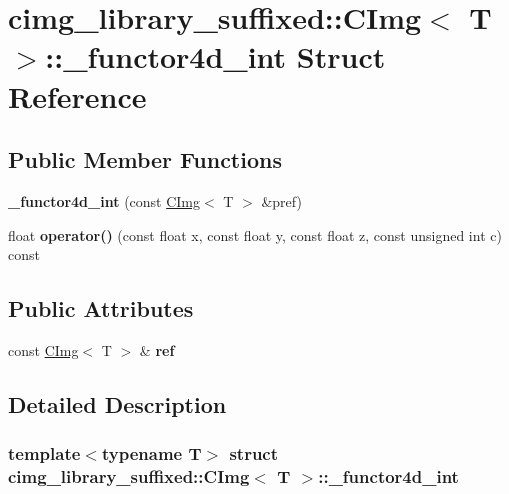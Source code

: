 \hypertarget{structcimg__library__suffixed_1_1CImg_1_1__functor4d__int}{}\section{cimg\+\_\+library\+\_\+suffixed\+:\+:C\+Img$<$ T $>$\+:\+:\+\_\+functor4d\+\_\+int Struct Reference}
\label{structcimg__library__suffixed_1_1CImg_1_1__functor4d__int}
\subsection*{Public Member Functions}
\begin{DoxyCompactItemize}
\item 
\mbox{\label{structcimg__library__suffixed_1_1CImg_1_1__functor4d__int_a497876b7332984108b6ae60b9bd3a1ce}} 
{\bfseries \+\_\+functor4d\+\_\+int} (const \hyperlink{structcimg__library__suffixed_1_1CImg}{C\+Img}$<$ T $>$ \&pref)
\item 
\mbox{\label{structcimg__library__suffixed_1_1CImg_1_1__functor4d__int_a948af15f62a8c8270cfcd5c5eee59ad6}} 
float {\bfseries operator()} (const float x, const float y, const float z, const unsigned int c) const
\end{DoxyCompactItemize}
\subsection*{Public Attributes}
\begin{DoxyCompactItemize}
\item 
\mbox{\label{structcimg__library__suffixed_1_1CImg_1_1__functor4d__int_a6c9cfad39fcfbb4617efdd5e33509d46}} 
const \hyperlink{structcimg__library__suffixed_1_1CImg}{C\+Img}$<$ T $>$ \& {\bfseries ref}
\end{DoxyCompactItemize}


\subsection{Detailed Description}
\subsubsection*{template$<$typename T$>$\newline
struct cimg\+\_\+library\+\_\+suffixed\+::\+C\+Img$<$ T $>$\+::\+\_\+functor4d\+\_\+int}



